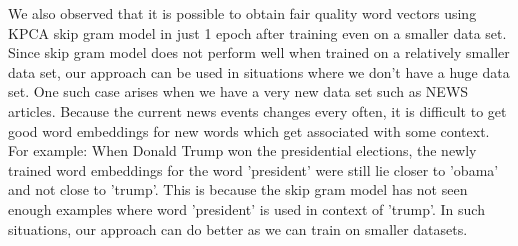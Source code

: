 We also observed that it is possible to obtain fair quality word vectors using KPCA skip gram model in just 1 epoch after training even on a smaller data set. Since skip gram model does not perform well when trained on a relatively smaller data set, our approach can be used in situations where we don't have a huge data set. One such case arises when we have a very new data set such as NEWS articles. Because the current news events changes every often, it is difficult to get good word embeddings for new words which get associated with some context. For example: When Donald Trump won the presidential elections, the newly trained word embeddings for the word 'president' were still lie closer to 'obama' and not close to 'trump'. This is because the skip gram model has not seen enough examples where word 'president' is used in context of 'trump'. In such situations, our approach can do better as we can train on smaller datasets. \\


